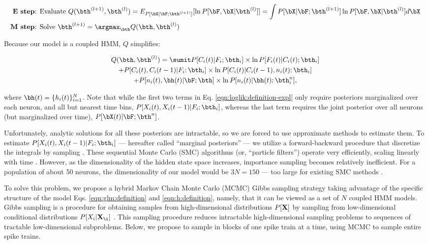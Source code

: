 \begin{align*}
\textbf{E step} &\text{: Evaluate } Q(\bth^{(l+1)},\bth^{(l)}) = E_{P[\bX | \bF; \bth^{(l+1)}]}[ \ln P[\bF, \bX | \bth^{(l)}]] = \int P[\bX | \bF; \bth^{(l+1)}] \ln P[\bF, \bX | \bth^{(l)}] d \bX  \\
\textbf{M step} &\text{: Solve } \bth^{(l+1)} = \argmax_{\bth} Q(\bth,\bth^{(l)})  
\end{align*}

Because our model is a coupled HMM, $Q$ simplifies:

\begin{multline}\label{eqn:loglik:definition-expl}
Q(\bth,\bth^{(l)}) = 
\sumit 
P[C_i(t) | F_i; \bth_i] \times \ln P[F_i(t)|C_i(t); \bth_i] 
\\ + P[C_i(t), C_i(t-1) | F_i; \bth_i] \times \ln P[C_i(t)|C_i(t-1), n_i(t); \bth_i] 
\\ + P[n_i(t), \bh(t) | \bF; \bth] \times \ln P[n_i(t)| \bh(t); \bth^n_i],
\end{multline}

\noindent where $\bh(t)=\{h_i(t)\}_{i=1}^N$.  Note that while the first two terms in Eq. \eqref{eqn:loglik:definition-expl} only require posteriors marginalized over each neuron, and all but nearest time bins, $P[X_i(t), X_i(t-1) | F_i; \bth_i]$, whereas the last term requires the joint posterior over all neurons (but marginalized over time), $P[\bX(t) | \bF; \bth^n]$.  

Unfortunately, analytic solutions for all these posteriors are intractable, so we are forced to use approximate methods to estimate them.  To estimate $P[X_i(t), X_i(t-1) | F_i; \bth_i]$ --- hereafter called ``marginal posteriors'' ---  we utilize a forward-backward procedure that discretize the integrals by sampling \cite{DFG01, MINKAPHD, Fearnhead2003, koyama08, Andrieu2007, NBR03}.  These sequential Monte Carlo (SMC) algorithms (or, ``particle filters'') operate very efficiently, scaling linearly with time \cite{RAB89}. However, as the dimensionality of the hidden state space increases, importance sampling becomes relatively inefficient.  For a population of about 50 neurons, the dimensionality of our model would be $3N=150$ --- too large for existing SMC methods \cite{??}.  

To solve this problem, we propose a hybrid Markov Chain Monte Carlo (MCMC) Gibbs sampling strategy taking advantage of the specific structure of the model Eqs. \eqref{eqn:glm:definition} and \eqref{eqn:h:definition}, namely, that it can be viewed as a set of $N$ coupled HMM models. Gibbs sampling is a procedure for obtaining samples from high-dimensional distributions $P[{\bf X}]$ by sampling from low-dimensional conditional distributions $P[X_{i}|{\bf X}_{\i}]$  \cite{Gelfand1990}.  This sampling procedure reduces intractable high-dimensional sampling problems to sequences of tractable low-dimensional subproblems.  Below, we propose to sample in blocks of one spike train at a time, using MCMC to sample entire spike trains.

